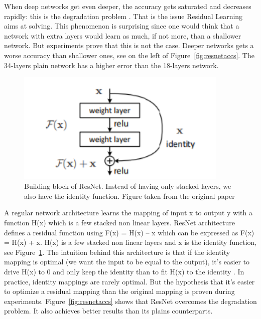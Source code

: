 When deep networks get even deeper, the accuracy gets saturated and decreases rapidly: this is the degradation problem \cite{resnetpaper}. That is the issue Residual Learning aims at solving. This phenomenon is surprising since one would think that a network with extra layers would learn as much, if not more, than a shallower network. But experiments prove that this is not the case. Deeper networks gets a worse accuracy than shallower ones, see on the left of Figure~\ref{fig:resnetaccs}. The 34-layers plain network has a higher error than the 18-layers network. 

\begin{figure}[!htp]
    \centering
        \includegraphics[width=0.9\textwidth]{figures/02-resnet_block}
        \caption[Building block of Resnet]{Building block of ResNet. Instead of having only stacked layers, we also have the identity function. Figure taken from the original paper \cite{resnetpaper}}\label{fig:resnetblock}
\end{figure}
A regular network architecture learns the mapping of input x to output y with a function H(x) which is a few stacked non linear layers. ResNet architecture defines a residual function using F(x) = H(x) – x which can be expressed as F(x) = H(x) + x. H(x) is a few stacked non linear layers and x is the identity function, see Figure~\ref{fig:resnetblock}. The intuition behind this architecture is that if the identity mapping is optimal (we want the input to be equal to the output), it’s easier to drive H(x) to 0 and only keep the identity than to fit H(x) to the identity \cite{mediumresnet}. In practice, identity mappings are rarely optimal. But the hypothesis that it’s easier to optimize a residual mapping  than the original mapping is proven during experiments. Figure~\ref{fig:resnetaccs} shows that ResNet overcomes the degradation problem. It also achieves better results than its plains counterparts.


